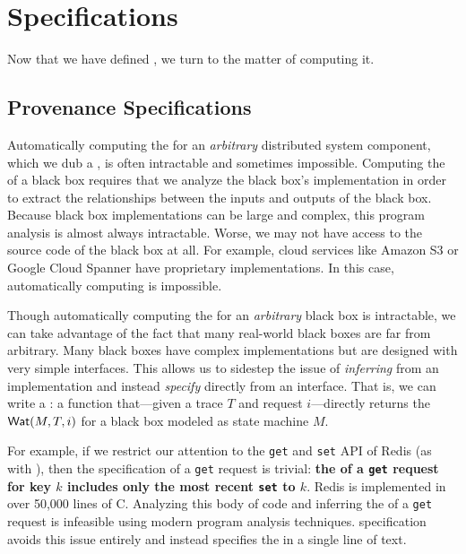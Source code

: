 \section{\WatProvenance{} Specifications}
Now that we have defined \watprovenance{}, we turn to the matter of computing it.

\subsection{Provenance Specifications}
Automatically computing the \watprovenance{} for an \emph{arbitrary}
distributed system component, which we dub a , is often
intractable and sometimes impossible. Computing the \watprovenance{} of a black
box requires that we analyze the black box's implementation in order to extract
the relationships between the inputs and outputs of the black box. Because
black box implementations can be large and complex, this program analysis is
almost always intractable. Worse, we may not have access to the source code of
the black box at all. For example, cloud services like Amazon S3 or Google
Cloud Spanner have proprietary implementations. In this case,
automatically computing \watprovenance{} is impossible.

\newcommand{\kvget}{\texttt{get}}
\newcommand{\kvset}{\texttt{set}}

Though automatically computing the \watprovenance{} for an \emph{arbitrary}
black box is intractable, we can take advantage of the fact that many
real-world black boxes are far from arbitrary. Many black boxes have complex
implementations but are designed with very simple interfaces. This allows us
to sidestep the issue of \emph{inferring} \watprovenance{} from an
implementation and instead \emph{specify} \watprovenance{} directly from an
interface. That is, we can write a : a
function that---given a trace $T$ and request $i$---directly returns the
\watprovenance{} $\textsf{Wat}(M, T, i)$ for a black box modeled as state machine $M$.

For example, if we restrict our attention to the \kvget{} and \kvset{} API of
Redis (as with ), then the \watprovenance{}
specification of a \kvget{} request is trivial: \textbf{the \watprovenance{} of
a \kvget{} request for key $k$ includes only the most recent \kvset{} to
$k$}. Redis is implemented in over 50,000 lines of C. Analyzing this body of
code and inferring the \watprovenance{} of a \kvget{} request is infeasible
using modern program analysis techniques. \Watprovenance{} specification
avoids this issue entirely and instead specifies the \watprovenance{} in a
single line of text.

